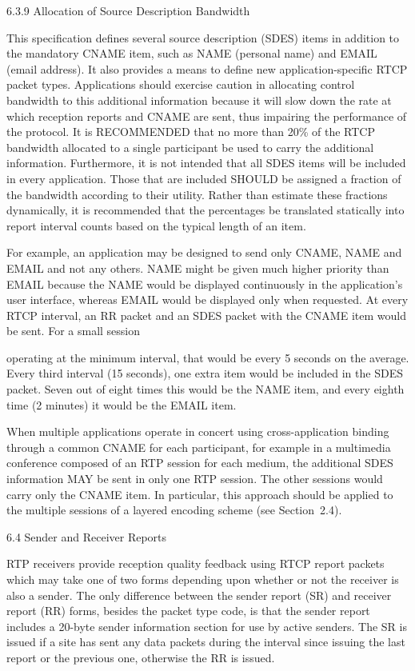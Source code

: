 \documentclass{article}
\begin{document}
6.3.9 Allocation of Source Description Bandwidth

This specification defines several source description (SDES) items in addition to the mandatory CNAME item, such as NAME (personal name) and EMAIL (email address).  It also provides a means to define new application-specific RTCP packet types.  Applications should exercise caution in allocating control bandwidth to this additional information because it will slow down the rate at which reception reports and CNAME are sent, thus impairing the performance of the protocol.  It is RECOMMENDED that no more than 20\% of the RTCP bandwidth allocated to a single participant be used to carry the additional information.  Furthermore, it is not intended that all SDES items will be included in every application.  Those that are included SHOULD be assigned a fraction of the bandwidth according to their utility.  Rather than estimate these fractions dynamically, it is recommended that the percentages be translated statically into report interval counts based on the typical length of an item.

For example, an application may be designed to send only CNAME, NAME and EMAIL and not any others.  NAME might be given much higher priority than EMAIL because the NAME would be displayed continuously in the application's user interface, whereas EMAIL would be displayed only when requested.  At every RTCP interval, an RR packet and an SDES packet with the CNAME item would be sent.  For a small session

operating at the minimum interval, that would be every 5 seconds on the average.  Every third interval (15 seconds), one extra item would be included in the SDES packet.  Seven out of eight times this would be the NAME item, and every eighth time (2 minutes) it would be the EMAIL item.

When multiple applications operate in concert using cross-application binding through a common CNAME for each participant, for example in a multimedia conference composed of an RTP session for each medium, the additional SDES information MAY be sent in only one RTP session.  The other sessions would carry only the CNAME item.  In particular, this approach should be applied to the multiple sessions of a layered encoding scheme (see Section~2.4).

6.4 Sender and Receiver Reports

RTP receivers provide reception quality feedback using RTCP report packets which may take one of two forms depending upon whether or not the receiver is also a sender.  The only difference between the sender report (SR) and receiver report (RR) forms, besides the packet type code, is that the sender report includes a 20-byte sender information section for use by active senders.  The SR is issued if a site has sent any data packets during the interval since issuing the last report or the previous one, otherwise the RR is issued.
\end{document}
